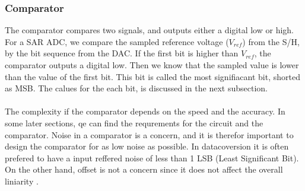 \documentclass[english, 12pt, a4paper]{article}
\begin{document}
\subsubsection{Comparator}
The comparator compares two signals, and outputs either a digital low or high. For a SAR ADC, we compare the sampled reference voltage (\(V_{ref}\)) from the S/H, by the bit sequence from the DAC. 
If the first bit is higher than \(V_{ref}\), the comparator outputs a digital low. Then we know that the sampled value is lower than the value of the first bit. This bit is called the most 
signifiacant bit, shorted as MSB. The calues for the each bit, is discussed in the next subsection.\\
\\
The complexity if the comparator depends on the speed and the accuracy. In some later sections, qe can find the requrements for the circuit and the comparator. Noise in a comparator is a 
concern, and it is therefor important to design the comparator for as low noise as possible. In datacoversion it is often prefered to have a input reffered noise of less than 1 LSB 
(Least Significant Bit). On the other hand, offset is not a concern since it does not affect the overall liniarity \cite{sar-adc-concept}. 
\end{document}
